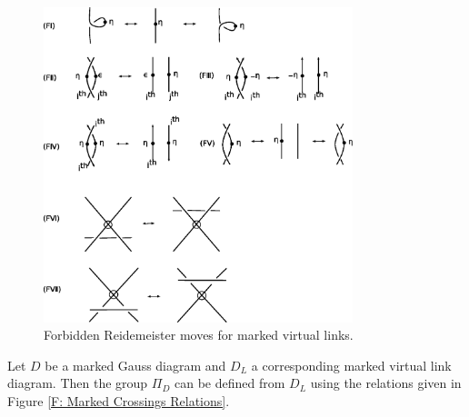 \documentclass[11 pt, reqno]{amsart}
\theoremstyle{definition}
\numberwithin{equation}{subsection}
\begin{document}
\begin{figure}[H]
\includegraphics[width=9cm]{ForbiddenReidMoves.eps}
\caption{Forbidden Reidemeister moves for marked virtual links.} \label{F: ForbiddenReidMoves}
\end{figure}

Let $D$ be a marked Gauss diagram and $D_L$ a corresponding marked virtual link diagram. Then the group $\Pi_D$ can be defined from $D_L$ using the relations given in Figure \ref{F: Marked Crossings Relations}.
\end{document}
